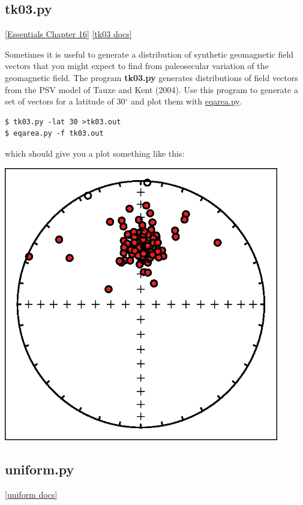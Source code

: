 \documentclass[11pt]{book}
\begin{document}
{

\subsection{tk03.py}
\href{http://earthref.org/MAGIC/books/Tauxe/Essentials/WebBook3ch16.html/#ch16}{[Essentials Chapter 16]}
\href{https://github.com/PmagPy/PmagPy/blob/master/programs/tk03.py}{[tk03 docs]}

Sometimes it is useful to generate a distribution of synthetic geomagnetic field vectors that you might expect to find from paleosecular variation of the geomagnetic field.  The program {\bf tk03.py} generates distributions of field vectors from the PSV model of Tauxe and Kent (2004).  \nocite{tauxe04}    Use this program to generate a set of vectors  for a latitude of 30$^{\circ}$ and plot them with \href{#eqarea.py}{eqarea.py}.

\begin{verbatim}
$ tk03.py -lat 30 >tk03.out
$ eqarea.py -f tk03.out
\end{verbatim}

which should give you a plot something like this:

\includegraphics[width=12cm]{EPSfiles/tk03.eps}


\subsection{uniform.py}
\href{https://github.com/PmagPy/PmagPy/blob/master/programs/uniform.py}{[uniform docs]}

}
\end{document}
